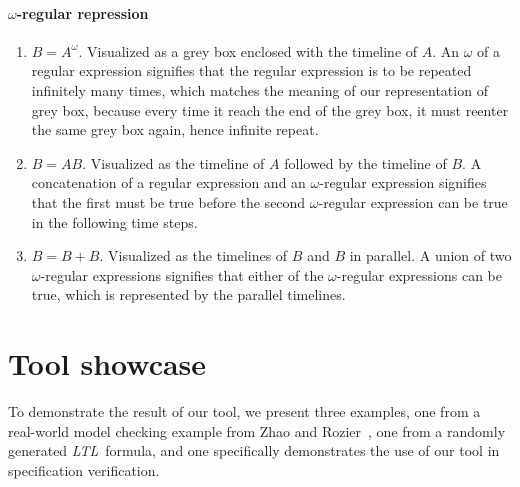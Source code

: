 \documentclass[conference]{IEEEtran}
\theoremstyle{definition}
\theoremstyle{remark}
\newcommand{\ltl}{\textit{LTL}}
\begin{document}
\paragraph{$\omega$-regular repression}
\begin{enumerate}
  \item $B = A^\omega$. Visualized as a grey box enclosed with the timeline of $A$. An $\omega$ of a regular expression signifies that the regular expression is to be repeated infinitely many times, which matches the meaning of our representation of grey box, because every time it reach the end of the grey box, it must reenter the same grey box again, hence infinite repeat.
  \item $B = AB$. Visualized as the timeline of $A$ followed by the timeline of $B$. A concatenation of a regular expression and an $\omega$-regular expression signifies that the first must be true before the second $\omega$-regular expression can be true in the following time steps.
  \item $B = B + B$. Visualized as the timelines of $B$ and $B$ in parallel. A union of two $\omega$-regular expressions signifies that either of the $\omega$-regular expressions can be true, which is represented by the parallel timelines.
\end{enumerate}

\section{Tool showcase} \label{sec:tool-showcase}
To demonstrate the result of our tool, we present three examples, one from a real-world model checking example from Zhao and Rozier~\cite{ZR14}, one from a randomly generated \ltl\ formula, and one specifically demonstrates the use of our tool in specification verification.
\end{document}
